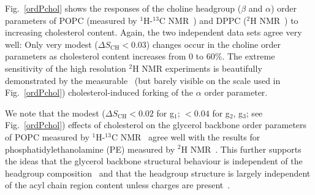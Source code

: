 \documentclass[journal=jpcbfk,manuscript=article]{achemso}
\begin{document}
Fig.~\ref{ordPchol} shows the responses of the choline headgroup ($\beta$ and $\alpha$)
order parameters of POPC (measured by $^1$H-$^{13}$C NMR~\cite{ferreira13}) and DPPC
($^{2}$H NMR~\cite{brown78}) to increasing cholesterol content.
Again, the two independent data sets agree very well:
Only very modest ($\Delta S_\mathrm{CH}<0.03$) changes occur in  the choline order parameters as cholesterol content
increases from 0 to 60\%.
The extreme sensitivity of the
high resolution $^{2}$H NMR experiments
is beautifully demonstrated by the measurable~\cite{brown78}
(but barely visible on the scale used in Fig.~\ref{ordPchol})
cholesterol-induced forking of the $\alpha$ order parameter.

We note that the modest ($\Delta S_\mathrm{CH}<0.02$ for g$_1$; $<0.04$ for g$_2$, g$_3$; see Fig.~\ref{ordPchol})
effects of cholesterol
on the glycerol backbone order parameters of POPC
measured by $^1$H-$^{13}$C NMR~\cite{ferreira13}
agree well with the results for phosphatidylethanolamine (PE) measured by $^{2}$H NMR~\cite{ghosh82}.
This further supports the ideas that the glycerol backbone structural behaviour is independent of the
headgroup composition~\cite{gally81} and that the headgroup structure is largely independent of the acyl chain region content unless
charges are present~\cite{scherer87}.
\end{document}
